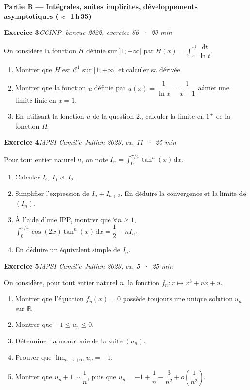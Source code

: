 \documentclass[11pt,a4paper]{article}
\newcommand{\R}{\mathbb{R}}
\newcommand{\dd}{\,\mathrm{d}}
\newcommand{\exo}[3]{\vspace{1.2em}\noindent\textbf{\large Exercice #1}\hfill\textit{#2 \,·\, #3}\par\smallskip}
\begin{document}
\newpage
\noindent\textbf{Partie B --- Int\'egrales, suites implicites, d\'eveloppements asymptotiques (\(\approx\) 1\,h\,35)}

\exo{3}{CCINP, banque 2022, exercice 56}{20 min}
\noindent On consid\`ere la fonction $H$ d\'efinie sur $]1;+\infty[$ par $H(x)=\displaystyle\int_x^{x^2}\dfrac{\dd t}{\ln t}$.
\begin{enumerate}
\item Montrer que $H$ est $\mathcal{C}^1$ sur $]1;+\infty[$ et calculer sa d\'eriv\'ee.
\item Montrer que la fonction $u$ d\'efinie par $u(x)=\dfrac{1}{\ln x}-\dfrac{1}{x-1}$ admet une limite finie en $x=1$.
\item En utilisant la fonction $u$ de la question 2., calculer la limite en $1^+$ de la fonction $H$.
\end{enumerate}

\exo{4}{MPSI Camille Jullian 2023, ex. 11}{25 min}
\noindent Pour tout entier naturel $n$, on note $I_n=\displaystyle\int_0^{\pi/4}\tan^n(x)\dd x$.
\begin{enumerate}
\item Calculer $I_0$, $I_1$ et $I_2$.
\item Simplifier l'expression de $I_n+I_{n+2}$. En d\'eduire la convergence et la limite de $(I_n)$.
\item \`A l'aide d'une IPP, montrer que $\forall n\geqslant 1$, $\displaystyle\int_0^{\pi/4}\cos(2x)\tan^n(x)\dd x=\dfrac12-nI_n$.
\item En d\'eduire un \'equivalent simple de $I_n$.
\end{enumerate}

\exo{5}{MPSI Camille Jullian 2023, ex. 5}{25 min}
\noindent On consid\`ere, pour tout entier naturel $n$, la fonction $f_n : x\mapsto x^3+nx+n$.
\begin{enumerate}
\item Montrer que l'\'equation $f_n(x)=0$ poss\`ede toujours une unique solution $u_n$ sur $\R$.
\item Montrer que $-1\leqslant u_n\leqslant 0$.
\item D\'eterminer la monotonie de la suite $(u_n)$.
\item Prouver que $\displaystyle\lim_{n\to+\infty}u_n=-1$.
\item Montrer que $u_n+1\sim\dfrac1n$, puis que $u_n=-1+\dfrac1n-\dfrac{3}{n^2}+o\!\left(\dfrac1{n^2}\right)$.
\end{enumerate}
\end{document}
